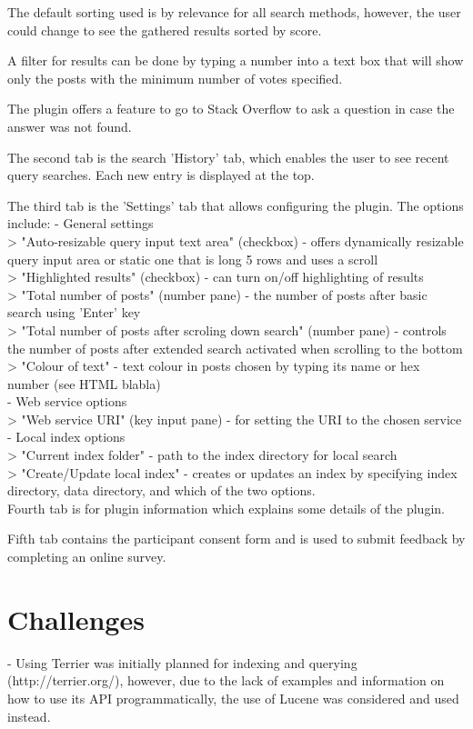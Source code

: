 \documentclass{l4proj}
\begin{document}
The default sorting used is by relevance for all search methods, however, the user could change to see the gathered results sorted by score.

A filter for results can be done by typing a number into a text box that will show only the posts with the minimum number of votes specified.

The plugin offers a feature to go to Stack Overflow to ask a question in case the answer was not found.

The second tab is the search 'History' tab, which enables the user to see recent query searches. Each new entry is displayed at the top.

The third tab is the 'Settings' tab that allows configuring the plugin. The options include:
- General settings\\
> "Auto-resizable query input text area" (checkbox) - offers dynamically resizable query input area or static one that is long 5 rows and uses a scroll\\
> "Highlighted results" (checkbox) - can turn on/off highlighting of results\\
> "Total number of posts" (number pane) - the number of posts after basic search using 'Enter' key \\
> "Total number of posts after scroling down search" (number pane) - controls the number of posts after extended search activated when scrolling to the bottom\\
> "Colour of text" - text colour in posts chosen by typing its name or hex number (see HTML blabla)\\
- Web service options\\
> "Web service URI" (key input pane) - for setting the URI to the chosen service\\
- Local index options\\
> "Current index folder" - path to the index directory for local search\\
> "Create/Update local index" - creates or updates an index by specifying index directory, data directory, and which of the two options.\\

Fourth tab is for plugin information which explains some details of the plugin.

Fifth tab contains the participant consent form and is used to submit feedback by completing an online survey.

\section{Challenges}
- Using Terrier was initially planned for indexing and querying (http://terrier.org/), however, due to the lack of examples and information on how to use its API programmatically, the use of Lucene was considered and used instead.
\end{document}
